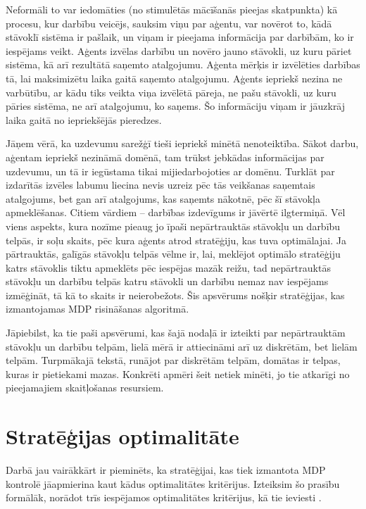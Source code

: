\documentclass{ludis} %
\begin{document}
Neformāli to var iedomāties (no stimulētās mācīšanās pieejas skatpunkta) kā
procesu, kur darbību veicējs, sauksim viņu par aģentu, var novērot to, kādā
stāvoklī sistēma ir pašlaik, un viņam ir pieejama informācija par darbībām, ko
ir iespējams veikt. Aģents izvēlas darbību un novēro jauno stāvokli, uz kuru
pāriet sistēma, kā arī rezultātā saņemto atalgojumu. Aģenta mērķis ir izvēlēties
darbības tā, lai maksimizētu laika gaitā saņemto atalgojumu. Aģents iepriekš
nezina ne varbūtību, ar kādu tiks veikta viņa izvēlētā pāreja, ne pašu stāvokli,
uz kuru pāries sistēma, ne arī atalgojumu, ko saņems. Šo informāciju viņam ir
jāuzkrāj laika gaitā no iepriekšējās pieredzes.

Jāņem vērā, ka uzdevumu sarežģī tieši iepriekš minētā nenoteiktība. Sākot darbu,
aģentam iepriekš nezināmā domēnā, tam trūkst jebkādas informācijas par uzdevumu,
un tā ir iegūstama tikai mijiedarbojoties ar domēnu. Turklāt par izdarītās
izvēles labumu liecina nevis uzreiz pēc tās veikšanas saņemtais atalgojums, bet
gan arī atalgojums, kas saņemts nākotnē, pēc šī stāvokļa apmeklēšanas. Citiem
vārdiem -- darbības izdevīgums ir jāvērtē ilgtermiņā. Vēl viens aspekts, kura
nozīme pieaug jo īpaši nepārtrauktās stāvokļu un darbību telpās, ir soļu skaits,
pēc kura aģents atrod stratēģiju, kas tuva optimālajai. Ja pārtrauktās, galīgās
stāvokļu telpās vēlme ir, lai, meklējot optimālo stratēģiju katrs stāvoklis
tiktu apmeklēts pēc iespējas mazāk reižu, tad nepārtrauktās stāvokļu un darbību
telpās katru stāvokli un darbību nemaz nav iespējams izmēģināt, tā kā to skaits
ir neierobežots. Šis apsvērums nošķir stratēģijas, kas izmantojamas MDP
risināšanas algoritmā. %




Jāpiebilst, ka tie paši apsvērumi, kas šajā nodaļā ir izteikti par nepārtrauktām
stāvokļu un darbību telpām, lielā mērā ir attiecināmi arī uz diskrētām, bet
lielām telpām. Turpmākajā tekstā, runājot par diskrētām telpām, domātas ir
telpas, kuras ir pietiekami mazas. Konkrēti apmēri šeit netiek minēti, jo tie
atkarīgi no pieejamajiem skaitļošanas resursiem.

\section{Stratēģijas optimalitāte}
Darbā jau vairākkārt ir pieminēts, ka stratēģijai, kas tiek izmantota MDP
kontrolē jāapmierina kaut kādus optimalitātes kritērijus. Izteiksim šo prasību
formālāk, norādot trīs iespējamos optimalitātes kritērijus, kā tie ieviesti
\autocite{Otterlo}.
\end{document}
